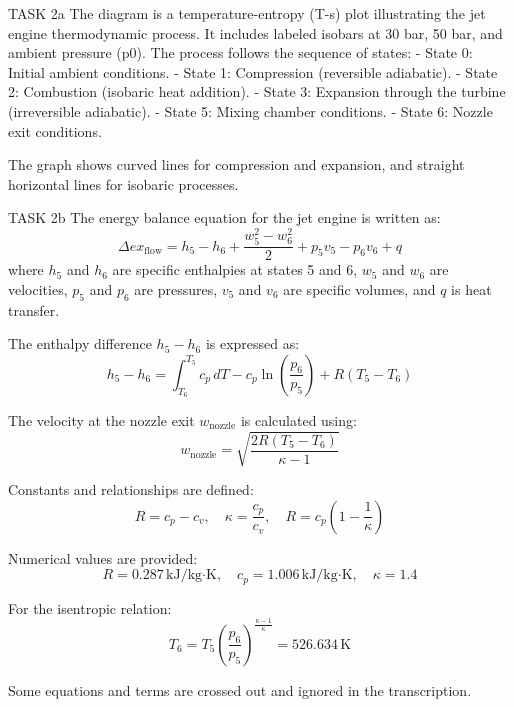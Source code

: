 TASK 2a  
The diagram is a temperature-entropy (T-s) plot illustrating the jet engine thermodynamic process. It includes labeled isobars at 30 bar, 50 bar, and ambient pressure (p0). The process follows the sequence of states:  
- State 0: Initial ambient conditions.  
- State 1: Compression (reversible adiabatic).  
- State 2: Combustion (isobaric heat addition).  
- State 3: Expansion through the turbine (irreversible adiabatic).  
- State 5: Mixing chamber conditions.  
- State 6: Nozzle exit conditions.  

The graph shows curved lines for compression and expansion, and straight horizontal lines for isobaric processes.  

TASK 2b  
The energy balance equation for the jet engine is written as:  
\[
\Delta ex_{\text{flow}} = h_5 - h_6 + \frac{w_5^2 - w_6^2}{2} + p_5 v_5 - p_6 v_6 + q
\]  
where \( h_5 \) and \( h_6 \) are specific enthalpies at states 5 and 6, \( w_5 \) and \( w_6 \) are velocities, \( p_5 \) and \( p_6 \) are pressures, \( v_5 \) and \( v_6 \) are specific volumes, and \( q \) is heat transfer.  

The enthalpy difference \( h_5 - h_6 \) is expressed as:  
\[
h_5 - h_6 = \int_{T_6}^{T_5} c_p \, dT - c_p \ln \left( \frac{p_6}{p_5} \right) + R \left( T_5 - T_6 \right)
\]  

The velocity at the nozzle exit \( w_{\text{nozzle}} \) is calculated using:  
\[
w_{\text{nozzle}} = \sqrt{\frac{2R(T_5 - T_6)}{\kappa - 1}}
\]  

Constants and relationships are defined:  
\[
R = c_p - c_v, \quad \kappa = \frac{c_p}{c_v}, \quad R = c_p \left( 1 - \frac{1}{\kappa} \right)
\]  

Numerical values are provided:  
\[
R = 0.287 \, \text{kJ/kg·K}, \quad c_p = 1.006 \, \text{kJ/kg·K}, \quad \kappa = 1.4
\]  

For the isentropic relation:  
\[
T_6 = T_5 \left( \frac{p_6}{p_5} \right)^{\frac{\kappa - 1}{\kappa}} = 526.634 \, \text{K}
\]  

Some equations and terms are crossed out and ignored in the transcription.